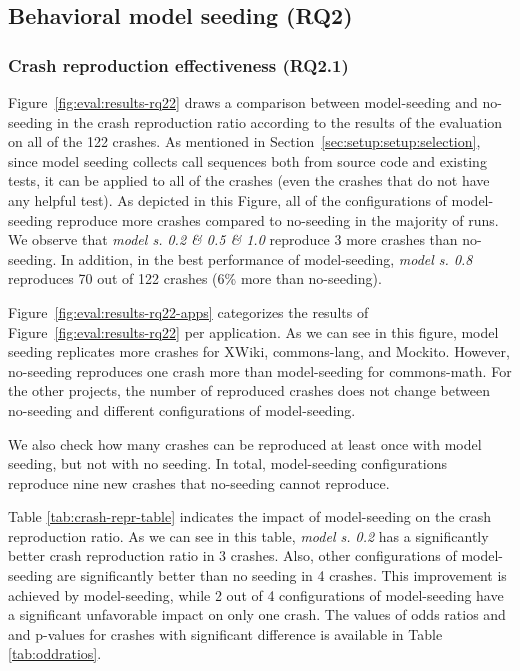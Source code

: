 \subsection{Behavioral model seeding (\textbf{RQ2})}



\subsubsection{Crash reproduction effectiveness (\textbf{RQ2.1})}

Figure~\ref{fig:eval:results-rq22} draws a comparison between model-seeding and no-seeding in the crash reproduction ratio according to the results of the evaluation on all of the 122 crashes. As mentioned in Section~\ref{sec:setup:setup:selection}, since model seeding collects call sequences both from source code and existing tests, it can be applied to all of the crashes (even the crashes that do not have any helpful test). As depicted in this Figure, all of the configurations of model-seeding reproduce more crashes compared to no-seeding in the majority of runs. We observe that \textit{model s. 0.2 \& 0.5 \& 1.0} reproduce 3 more crashes than no-seeding. In addition, in the best performance of model-seeding, \textit{model s. 0.8} reproduces 70 out of 122 crashes (6\% more than no-seeding).


Figure~\ref{fig:eval:results-rq22-apps} categorizes the results of Figure~\ref{fig:eval:results-rq22} per application. As we can see in this figure, model seeding replicates more crashes for XWiki, commons-lang, and Mockito. However, no-seeding reproduces one crash more than model-seeding for commons-math. For the other projects, the number of reproduced crashes does not change between no-seeding and different configurations of model-seeding. 

We also check how many crashes can be reproduced at least once with model seeding, but not with no seeding. In total, model-seeding configurations reproduce nine new crashes that no-seeding cannot reproduce.

Table \ref{tab:crash-repr-table} indicates the impact of model-seeding on the crash reproduction ratio. As we can see in this table, \textit{model s. 0.2} has a significantly better crash reproduction ratio in 3 crashes. Also, other configurations of model-seeding are significantly better than no seeding in 4 crashes. This improvement is achieved by model-seeding, while 2 out of 4 configurations of model-seeding have a significant unfavorable impact on only one crash. The values of odds ratios and and p-values for crashes with significant difference is available in Table \ref{tab:oddratios}.


